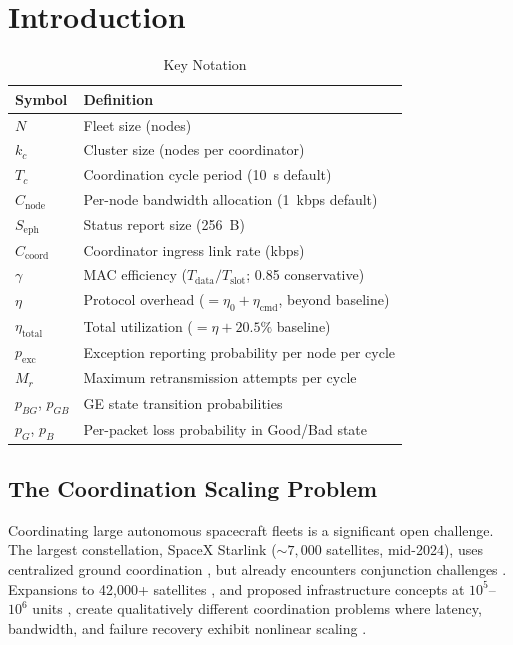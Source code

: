 \documentclass[journal]{IEEEtran}
\begin{document}
\section{Introduction}

\begin{table}[t]
    \centering
    \caption{Key Notation}
    \label{tab:notation}
    \begin{tabular}{@{}ll@{}}
        \toprule
        \textbf{Symbol} & \textbf{Definition} \\
        \midrule
        $N$ & Fleet size (nodes) \\
        $k_c$ & Cluster size (nodes per coordinator) \\
        $T_c$ & Coordination cycle period (10~s default) \\
        $C_{\text{node}}$ & Per-node bandwidth allocation (1~kbps default) \\
        $S_{\text{eph}}$ & Status report size (256~B) \\
        $C_{\text{coord}}$ & Coordinator ingress link rate (kbps) \\
        $\gamma$ & MAC efficiency ($T_{\text{data}} / T_{\text{slot}}$; 0.85 conservative) \\
        $\eta$ & Protocol overhead ($= \eta_0 + \eta_{\text{cmd}}$, beyond baseline) \\
        $\eta_{\text{total}}$ & Total utilization ($= \eta + 20.5\%$ baseline) \\
        $p_{\text{exc}}$ & Exception reporting probability per node per cycle \\
        $M_r$ & Maximum retransmission attempts per cycle \\
        $p_{BG}$, $p_{GB}$ & GE state transition probabilities \\
        $p_G$, $p_B$ & Per-packet loss probability in Good/Bad state \\
        \bottomrule
    \end{tabular}
\end{table}

\subsection{The Coordination Scaling Problem}

Coordinating large autonomous spacecraft fleets is a significant open challenge. The largest constellation, SpaceX Starlink (${\sim}7{,}000$ satellites, mid-2024), uses centralized ground coordination \cite{starlink_ops}, but already encounters conjunction challenges \cite{esa_conjunction}. Expansions to 42{,}000+ satellites \cite{kuiper, oneweb_mgmt}, and proposed infrastructure concepts at $10^5$--$10^6$ units \cite{oneil_1976, badescu_2006}, create qualitatively different coordination problems where latency, bandwidth, and failure recovery exhibit nonlinear scaling \cite{lynch_distributed}.
\end{document}
